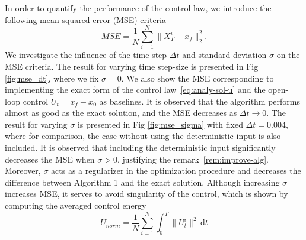 \documentclass[letterpaper, 10 pt, conference]{ieeeconf}  %
\newcommand{\at}[1]{{\color{blue} #1}}
\newcommand{\ud}{\,\mathrm{d}}
\begin{document}
In order to quantify the performance of the control law, we introduce the following mean-squared-error (MSE) criteria 
\begin{equation}\label{eq:mse}
    MSE = \frac{1}{N}\sum_{i=1}^N \|X_T^i - x_f\|_2^2.
\end{equation}
We investigate the influence of the time step $\Delta t$ and standard deviation $\sigma$ on the MSE criteria. 
The result for varying time step-size is presented in Fig \ref{fig:mse_dt}, where we fix $\sigma=0$. We also show the MSE corresponding to implementing the exact form of the control law~\eqref{eq:analy-sol-u} and the open-loop control $U_t=x_f-x_0$ as baselines. It is observed that the algorithm performs almost as good as the exact solution, and the MSE decreases as $\Delta t \to 0$. The result for varying $\sigma$ is presented in Fig \ref{fig:mse_sigma} with fixed $\Delta t = 0.004$, where for comparison, the case without using the deterministic input is also included. It is observed that including the deterministic input significantly decreases the MSE when $\sigma>0$, justifying the remark~\ref{rem:improve-alg}. Moreover, $\sigma$ acts as a regularizer in the optimization procedure and decreases the difference between Algorithm 1 and the exact solution. Although increasing $\sigma$ increases MSE, it serves to avoid singularity of the control,  which is shown by computing  the averaged control energy 
\begin{equation}\label{eq:unorm}
    U_{norm} = \frac{1}{N}\sum_{i=1}^N\int_0^T \|U_t^i\|^2 \ud t
\end{equation}
\end{document}
